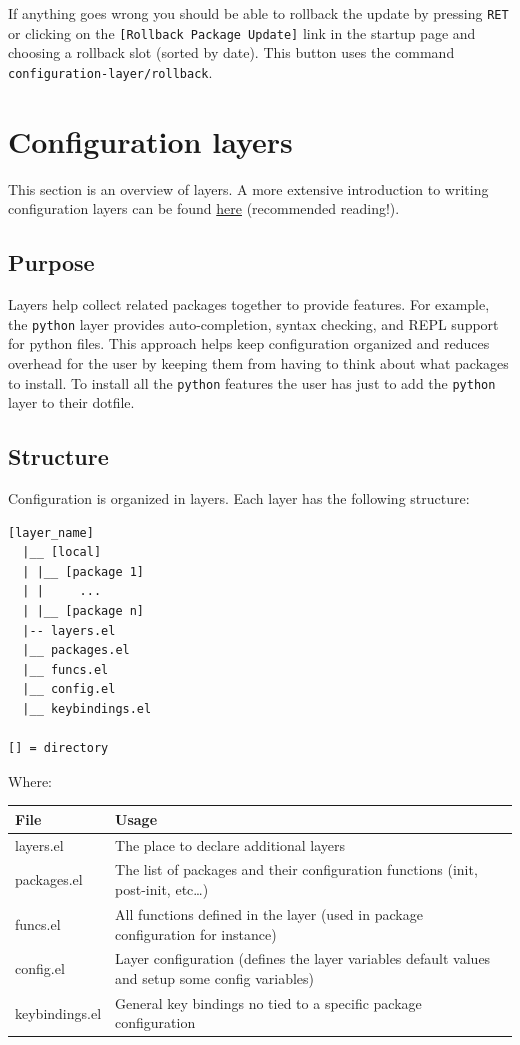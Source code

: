 \documentclass[11pt]{article}
\begin{document}
If anything goes wrong you should be able to rollback the update by pressing
\texttt{RET} or clicking on the \texttt{[Rollback Package Update]} link in the startup page
and choosing a rollback slot (sorted by date). This button uses the command
\texttt{configuration-layer/rollback}.

\section{Configuration layers}
\label{sec:org5007336}
This section is an overview of layers. A more extensive introduction to writing
configuration layers can be found \href{LAYERS.org}{here} (recommended reading!).

\subsection{Purpose}
\label{sec:orgc9d1819}
Layers help collect related packages together to provide features. For example,
the \texttt{python} layer provides auto-completion, syntax checking, and REPL support
for python files. This approach helps keep configuration organized and reduces
overhead for the user by keeping them from having to think about what packages
to install. To install all the \texttt{python} features the user has just to add the
\texttt{python} layer to their dotfile.

\subsection{Structure}
\label{sec:orgc1287dc}
Configuration is organized in layers. Each layer has the following structure:

\begin{verbatim}
[layer_name]
  |__ [local]
  | |__ [package 1]
  | |     ...
  | |__ [package n]
  |-- layers.el
  |__ packages.el
  |__ funcs.el
  |__ config.el
  |__ keybindings.el

[] = directory
\end{verbatim}

Where:

\begin{center}
\begin{tabular}{ll}
File & Usage\\
\hline
layers.el & The place to declare additional layers\\
packages.el & The list of packages and their configuration functions (init, post-init, etc\ldots{})\\
funcs.el & All functions defined in the layer (used in package configuration for instance)\\
config.el & Layer configuration (defines the layer variables default values and setup some config variables)\\
keybindings.el & General key bindings no tied to a specific package configuration\\
\end{tabular}
\end{center}
\end{document}
